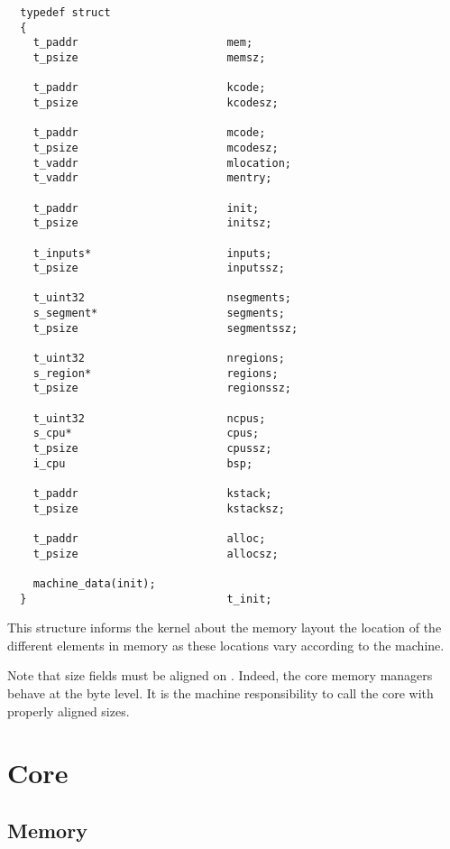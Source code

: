 \begin{verbatim}
  typedef struct
  {
    t_paddr                       mem;
    t_psize                       memsz;

    t_paddr                       kcode;
    t_psize                       kcodesz;

    t_paddr                       mcode;
    t_psize                       mcodesz;
    t_vaddr                       mlocation;
    t_vaddr                       mentry;

    t_paddr                       init;
    t_psize                       initsz;

    t_inputs*                     inputs;
    t_psize                       inputssz;

    t_uint32                      nsegments;
    s_segment*                    segments;
    t_psize                       segmentssz;

    t_uint32                      nregions;
    s_region*                     regions;
    t_psize                       regionssz;

    t_uint32                      ncpus;
    s_cpu*                        cpus;
    t_psize                       cpussz;
    i_cpu                         bsp;

    t_paddr                       kstack;
    t_psize                       kstacksz;

    t_paddr                       alloc;
    t_psize                       allocsz;

    machine_data(init);
  }                               t_init;
\end{verbatim}

This structure informs the kernel about the memory layout \ie{} the location
of the different elements in memory as these locations vary according to
the machine.

Note that size fields must be aligned on . Indeed, the
core memory managers behave at the byte level. It is the machine responsibility
to call the core with properly aligned sizes.

%
%

\section{Core}


\subsection*{Memory}

